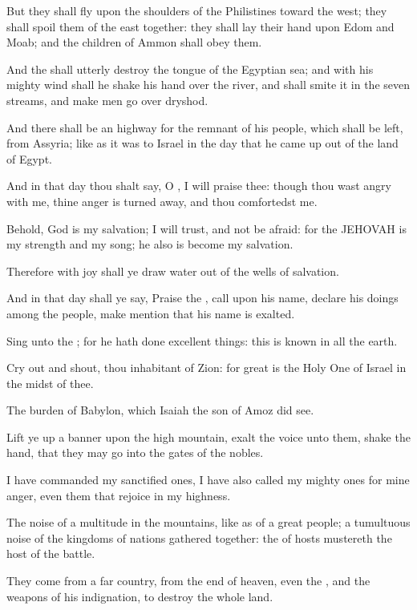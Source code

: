 \Verse But they shall fly upon the shoulders of the Philistines toward the west; they shall spoil them of the east together: they shall lay their hand upon Edom and Moab; and the children of Ammon shall obey them.

\Verse And the \LORD shall utterly destroy the tongue of the Egyptian sea; and with his mighty wind shall he shake his hand over the river, and shall smite it in the seven streams, and make men go over dryshod.

\Verse And there shall be an highway for the remnant of his people, which shall be left, from Assyria; like as it was to Israel in the day that he came up out of the land of Egypt.


\Chapter
\Verse And in that day thou shalt say, O \LORD, I will praise thee: though thou wast angry with me, thine anger is turned away, and thou comfortedst me.

\Verse Behold, God is my salvation; I will trust, and not be afraid: for the \LORD JEHOVAH is my strength and my song; he also is become my salvation.

\Verse Therefore with joy shall ye draw water out of the wells of salvation.

\Verse And in that day shall ye say, Praise the \LORD, call upon his name, declare his doings among the people, make mention that his name is exalted.

\Verse Sing unto the \LORD; for he hath done excellent things: this is known in all the earth.

\Verse Cry out and shout, thou inhabitant of Zion: for great is the Holy One of Israel in the midst of thee.


\Chapter
\Verse The burden of Babylon, which Isaiah the son of Amoz did see.

\Verse Lift ye up a banner upon the high mountain, exalt the voice unto them, shake the hand, that they may go into the gates of the nobles.

\Verse I have commanded my sanctified ones, I have also called my mighty ones for mine anger, even them that rejoice in my highness.

\Verse The noise of a multitude in the mountains, like as of a great people; a tumultuous noise of the kingdoms of nations gathered together: the \LORD of hosts mustereth the host of the battle.

\Verse They come from a far country, from the end of heaven, even the \LORD, and the weapons of his indignation, to destroy the whole land.

